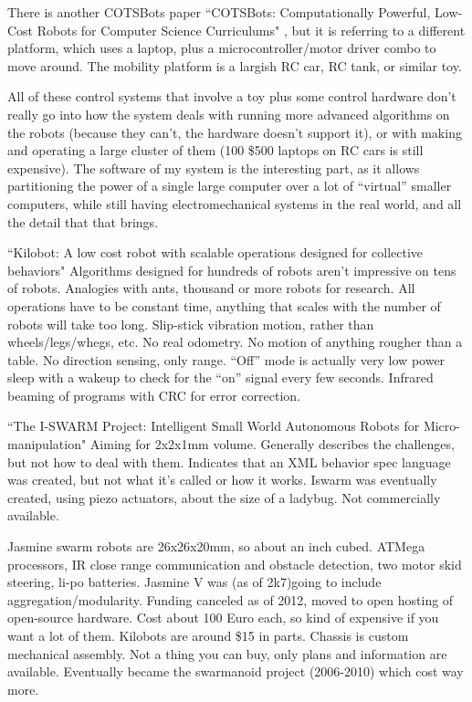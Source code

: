 \documentclass[]{article}
\begin{document}
There is another COTSBots paper ``COTSBots: Computationally Powerful, Low-Cost Robots for Computer Science Curriculums" \cite{soule2011cotsbots}, but it is referring to a different platform, which uses a laptop, plus a microcontroller/motor driver combo to move around. The mobility platform is a largish RC car, RC tank, or similar toy.

All of these control systems that involve a toy plus some control hardware don't really go into how the system deals with running more advanced algorithms on the robots (because they can't, the hardware doesn't support it), or with making and operating a large cluster of them (100 \$500 laptops on RC cars is still expensive). The software of my system is the interesting part, as it allows partitioning the power of a single large computer over a lot of ``virtual'' smaller computers, while still having electromechanical systems in the real world, and all the detail that that brings. 

``Kilobot: A low cost robot with scalable operations designed for collective behaviors" \cite{rubenstein2014kilobot} Algorithms designed for hundreds of robots aren't impressive on tens of robots. Analogies with ants, thousand or more robots for research. All operations have to be constant time, anything that scales with the number of robots will take too long. Slip-stick vibration motion, rather than wheels/legs/whegs, etc. No real odometry. No motion of anything rougher than a table. No direction sensing, only range. ``Off'' mode is actually very low power sleep with a wakeup to check for the ``on'' signal every few seconds. Infrared beaming of programs with CRC for error correction. 

``The I-SWARM Project: Intelligent Small World Autonomous Robots for Micro-manipulation" \cite{seyfried2005swarm} Aiming for 2x2x1mm volume. Generally describes the challenges, but not how to deal with them. Indicates that an XML behavior spec language was created, but not what it's called or how it works. Iswarm was eventually created, using piezo actuators, about the size of a ladybug. Not commercially available. 

Jasmine swarm robots are 26x26x20mm, so about an inch cubed. ATMega processors, IR close range communication and obstacle detection, two motor skid steering, li-po batteries. Jasmine V was (as of 2k7)going to include aggregation/modularity. Funding canceled as of 2012, moved to open hosting of open-source hardware. Cost about 100 Euro each, so kind of expensive if you want a lot of them. Kilobots are around \$15 in parts. Chassis is custom mechanical assembly. Not a thing you can buy, only plans and information are available. Eventually became the swarmanoid project (2006-2010) which cost way more. 
\end{document}
